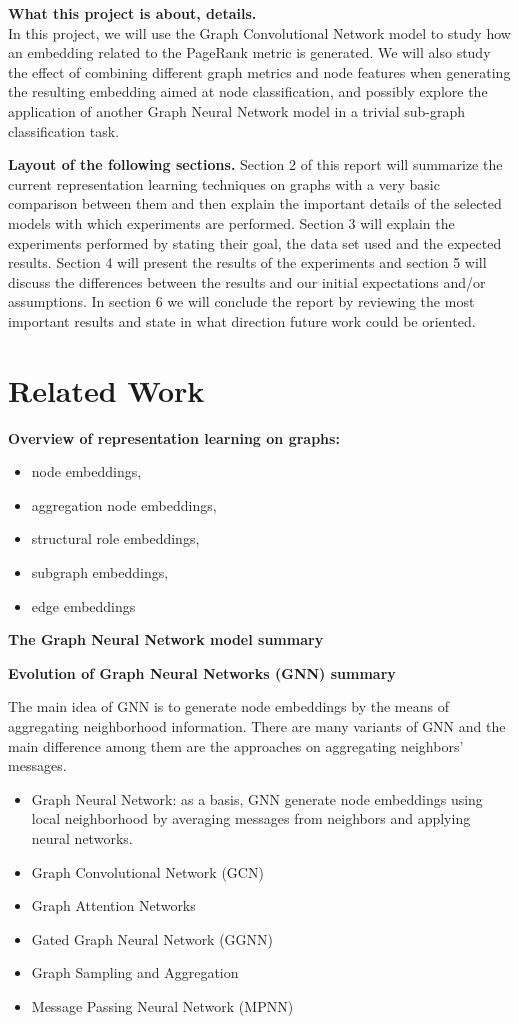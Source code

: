 \documentclass[a4paper]{article}
\begin{document}
\textbf{What this project is about, details.}\\
In this project, we will use the Graph Convolutional Network model to study how an embedding related to the PageRank metric is generated. We will also study the effect of combining different graph metrics and node features when generating the resulting embedding aimed at node classification, and possibly explore the application of another Graph Neural Network model in a trivial sub-graph classification task.

\textbf{Layout of the following sections.}
Section 2 of this report will summarize the current representation learning techniques on graphs with a very basic comparison between them and then explain the important details of the selected models with which experiments are performed. Section 3 will explain the experiments performed by stating their goal, the data set used and the expected results. Section 4 will present the results of the experiments and section 5 will discuss the differences between the results and our initial expectations and/or assumptions. In section 6 we will conclude the report by reviewing the most important results and state in what direction future work could be oriented.


\section{Related Work}



\textbf{Overview of representation learning on graphs:}
\begin{itemize}
    \item node embeddings, 
    \item aggregation node embeddings, 
    \item structural role embeddings, 
    \item subgraph embeddings, 
    \item edge embeddings
\end{itemize}

\textbf{The Graph Neural Network model summary }

\textbf{Evolution of Graph Neural Networks (GNN) summary }

The main idea of GNN is to generate node embeddings by the means of aggregating neighborhood information. There are many variants of GNN and the main difference among them are the approaches on aggregating neighbors' messages.  
\begin{itemize}
    \item Graph Neural Network: as a basis, GNN generate node embeddings using local neighborhood by averaging messages from neighbors and applying neural networks. 
    \item Graph Convolutional Network (GCN)
    \item Graph Attention Networks
    \item Gated Graph Neural Network (GGNN)
    \item Graph Sampling and Aggregation
    \item Message Passing Neural Network (MPNN)
    
\end{itemize}
\end{document}
